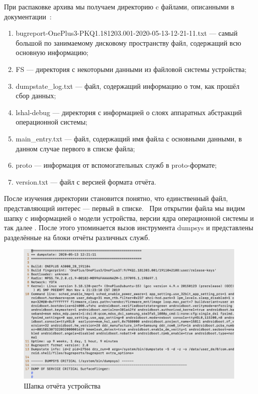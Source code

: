 \documentclass[a4paper,14pt]{extarticle} %
\begin{document}
	При распаковке архива мы получаем директорию c файлами, описанными в документации~\parencite{BugreportFormat}:
	\begin{enumerate}
		\item bugreport-OnePlus3-PKQ1.181203.001-2020-05-13-12-21-11.txt --- самый большой по занимаемому дисковому пространству файл, содержащий всю основную информацию;
		\item FS --- директория с некоторыми данными из файловой системы устройства;
		\item dumpstate\_log.txt --- файл, содержащий информацию о том, как прошёл сбор данных;
		\item lshal-debug --- директория с информацией о слоях аппаратных абстракций операционной системы;
		\item main\_entry.txt --- файл, содержащий имя файла с основными данными, в данном случае первого в списке файла;
		\item proto --- информация от вспомогательных служб в proto-формате;
		\item version.txt --- файл с версией формата отчёта.
	\end{enumerate}

	После изучения директории становится понятно, что единственный файл, представляющий интерес --- первый в списке.  При открытии файла мы видим шапку с информацией о модели устройства, версии ядра операционной системы и так далее \ris{\ref{fig:report_header}}. После этого упоминается вызов инструмента dumpsys и представлены разделённые на блоки отчёты различных служб. 
	
	\begin{figure}[!htb]
		\includegraphics[width=\textwidth]{report_header}
		\caption{Шапка отчёта устройства}
		\label{fig:report_header}
	\end{figure}
\end{document}
